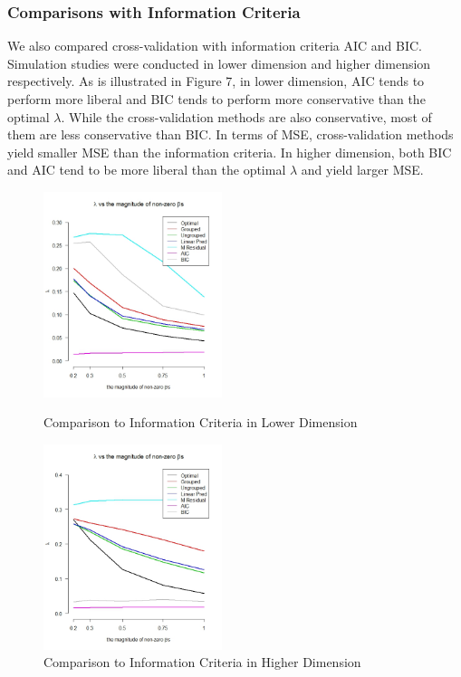 \documentclass{article}\usepackage[]{graphicx}\usepackage[]{color}
\begin{document}
  
  \vspace{20 mm}
    \subsubsection {Comparisons with Information Criteria}
    \par We also compared cross-validation with information criteria AIC and BIC. Simulation studies were conducted in lower dimension and higher dimension respectively. As is illustrated in Figure 7, in lower dimension, AIC tends to perform more liberal and BIC tends to perform more conservative than the optimal $\lambda$. While the cross-validation methods are also conservative, most of them are less conservative than BIC. In terms of MSE, cross-validation methods yield smaller MSE than the information criteria. In higher dimension, both BIC and AIC tend to be more liberal than the optimal $\lambda$ and yield larger MSE.

   \begin{figure}[h]
    \centering
    \begin{minipage}[b]{0.4\textwidth}
      \centering
		  \includegraphics[height= 6cm ]{./figures/aic_01.jpeg}
      \caption{Comparison to Information Criteria in Lower Dimension}
     \end{minipage}
     \begin{minipage}[b]{0.4\textwidth}
      \centering
		  \includegraphics[height= 6cm ]{./figures/aic_02.jpeg}
      \caption{Comparison to Information Criteria in Higher Dimension}
      \end{minipage}	
   \end{figure}	
    
\end{document}
